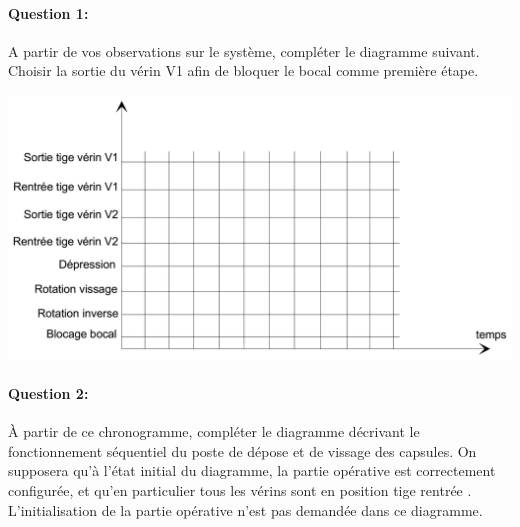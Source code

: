 \paragraph{Question 1:} A partir de vos observations sur le système, compléter le diagramme suivant. Choisir la sortie du vérin V1 afin de bloquer le bocal comme première étape.

\begin{center}
 \includegraphics[width=0.7\linewidth]{img/Chronogramme.png}
\end{center}

\paragraph{Question 2:}

À partir de ce chronogramme, compléter le diagramme décrivant le fonctionnement séquentiel du poste de dépose et de vissage des capsules. On supposera qu'à l'état initial du diagramme, la partie opérative est correctement configurée, et qu'en particulier tous les vérins sont en position \og tige rentrée \fg. L'initialisation de la partie opérative n'est pas demandée dans ce diagramme.

